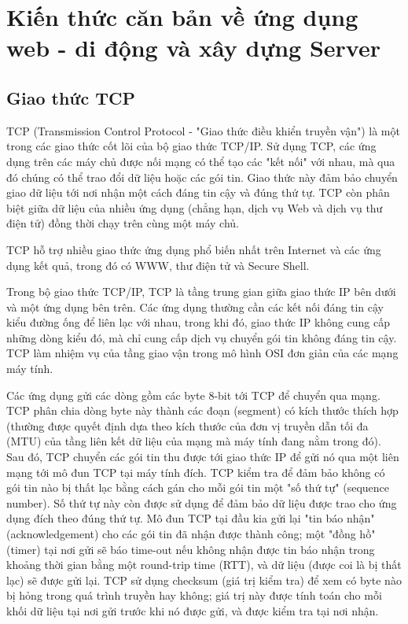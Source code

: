 \section{Kiến thức căn bản về ứng dụng web - di động và xây dựng Server}

\subsection{Giao thức TCP}
TCP (Transmission Control Protocol - "Giao thức điều khiển truyền vận") là một trong các giao thức cốt lõi của bộ giao thức TCP/IP. Sử dụng TCP, các ứng dụng trên các máy chủ được nối mạng có thể tạo các "kết nối" với nhau, mà qua đó chúng có thể trao đổi dữ liệu hoặc các gói tin. Giao thức này đảm bảo chuyển giao dữ liệu tới nơi nhận một cách đáng tin cậy và đúng thứ tự. TCP còn phân biệt giữa dữ liệu của nhiều ứng dụng (chẳng hạn, dịch vụ Web và dịch vụ thư điện tử) đồng thời chạy trên cùng một máy chủ.

TCP hỗ trợ nhiều giao thức ứng dụng phổ biến nhất trên Internet và các ứng dụng kết quả, trong đó có WWW, thư điện tử và Secure Shell.

Trong bộ giao thức TCP/IP, TCP là tầng trung gian giữa giao thức IP bên dưới và một ứng dụng bên trên. Các ứng dụng thường cần các kết nối đáng tin cậy kiểu đường ống để liên lạc với nhau, trong khi đó, giao thức IP không cung cấp những dòng kiểu đó, mà chỉ cung cấp dịch vụ chuyển gói tin không đáng tin cậy. TCP làm nhiệm vụ của tầng giao vận trong mô hình OSI đơn giản của các mạng máy tính.

Các ứng dụng gửi các dòng gồm các byte 8-bit tới TCP để chuyển qua mạng. TCP phân chia dòng byte này thành các đoạn (segment) có kích thước thích hợp (thường được quyết định dựa theo kích thước của đơn vị truyền dẫn tối đa (MTU) của tầng liên kết dữ liệu của mạng mà máy tính đang nằm trong đó). Sau đó, TCP chuyển các gói tin thu được tới giao thức IP để gửi nó qua một liên mạng tới mô đun TCP tại máy tính đích. TCP kiểm tra để đảm bảo không có gói tin nào bị thất lạc bằng cách gán cho mỗi gói tin một "số thứ tự" (sequence number). Số thứ tự này còn được sử dụng để đảm bảo dữ liệu được trao cho ứng dụng đích theo đúng thứ tự. Mô đun TCP tại đầu kia gửi lại "tin báo nhận" (acknowledgement) cho các gói tin đã nhận được thành công; một "đồng hồ" (timer) tại nơi gửi sẽ báo time-out nếu không nhận được tin báo nhận trong khoảng thời gian bằng một round-trip time (RTT), và dữ liệu (được coi là bị thất lạc) sẽ được gửi lại. TCP sử dụng checksum (giá trị kiểm tra) để xem có byte nào bị hỏng trong quá trình truyền hay không; giá trị này được tính toán cho mỗi khối dữ liệu tại nơi gửi trước khi nó được gửi, và được kiểm tra tại nơi nhận.

